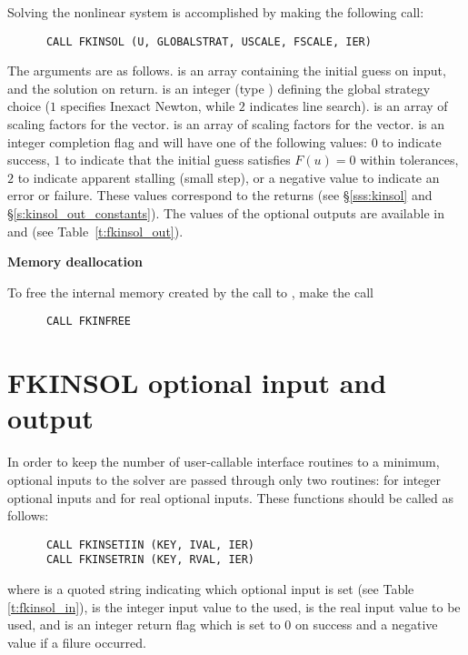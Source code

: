 \begin{Steps}
  Solving the nonlinear system is accomplished by making the following call:
\begin{verbatim}
      CALL FKINSOL (U, GLOBALSTRAT, USCALE, FSCALE, IER)
\end{verbatim}
  The arguments are as follows.
   is an array containing the initial guess on input, and the
  solution on return.
   is an integer (type ) defining the global strategy 
  choice ($1$ specifies Inexact Newton, while $2$ indicates line search).
   is an array of scaling factors for the  vector.
   is an array of scaling factors for the  vector.
   is an integer completion flag and will have one of the following values:
  $0$ to indicate success,
  $1$ to indicate that the initial guess satisfies $F(u) = 0$ within tolerances,
  $2$ to indicate apparent stalling (small step), or a negative value to indicate
  an error or failure. These values correspond to the  returns
  (see \S\ref{sss:kinsol} and \S\ref{s:kinsol_out_constants}). The values of
  the optional outputs are available in  and 
  (see Table~\ref{t:fkinsol_out}).

\item {\bf Memory deallocation}

  To free the internal memory created by the call to ,
  make the call
\begin{verbatim}
      CALL FKINFREE
\end{verbatim}

\end{Steps}


\section{FKINSOL optional input and output}

In order to keep the number of user-callable {\fkinsol} interface routines to
a minimum, optional inputs to the {\kinsol} solver are passed through only two
routines:  for integer optional inputs and 
for real optional inputs. These functions should be called as follows:
\begin{verbatim}
      CALL FKINSETIIN (KEY, IVAL, IER)
      CALL FKINSETRIN (KEY, RVAL, IER)
\end{verbatim}
where  is a quoted string indicating which optional input is set
(see Table \ref{t:fkinsol_in}),
 is the integer input value to the used,
 is the real input value to be used, and
 is an integer return flag which is set to $0$ on success and
a negative value if a filure occurred.

